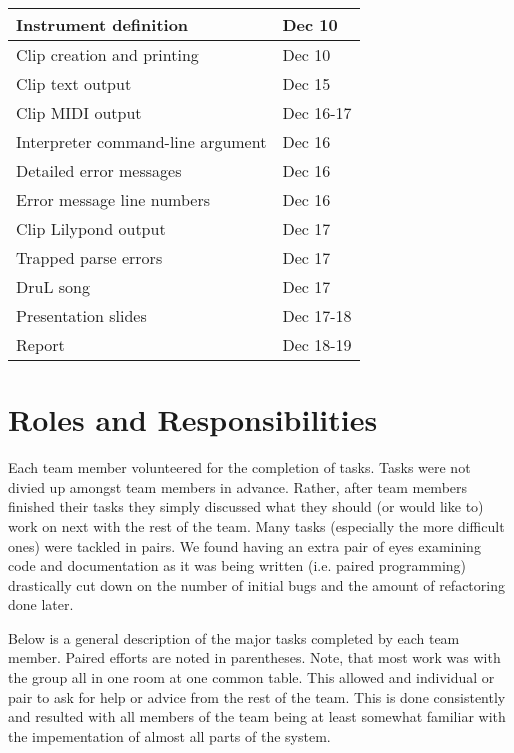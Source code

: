 \begin{tabular}{ | l | l | }
	Instrument definition                  & Dec 10          \\ \hline
	Clip creation and printing             & Dec 10          \\ \hline
	Clip text output                       & Dec 15          \\ \hline
	Clip MIDI output                       & Dec 16-17       \\ \hline
	Interpreter command-line argument      & Dec 16          \\ \hline
	Detailed error messages                & Dec 16          \\ \hline
	Error message line numbers             & Dec 16          \\ \hline
	Clip Lilypond output                   & Dec 17          \\ \hline
	Trapped parse errors                   & Dec 17          \\ \hline
	DruL song                              & Dec 17          \\ \hline
	Presentation slides                    & Dec 17-18       \\ \hline
	Report                                 & Dec 18-19       \\ \hline
\end{tabular}

\section{Roles and Responsibilities}

Each team member volunteered for the completion of tasks.  Tasks were not divied up amongst team members in advance.  Rather, after team members finished their tasks they simply discussed what they should (or would like to) work on next with the rest of the team.  Many tasks (especially the more difficult ones) were tackled in pairs.  We found having an extra pair of eyes examining code and documentation as it was being written (i.e. paired programming) drastically cut down on the number of initial bugs and the amount of refactoring done later.

Below is a general description of the major tasks completed by each team member.  Paired efforts are noted in parentheses.  Note, that most work was with the group all in one room at one common table.  This allowed and individual or pair to ask for help or advice from the rest of the team.  This is done consistently and resulted with all members of the team being at least somewhat familiar with the impementation of almost all parts of the system.


